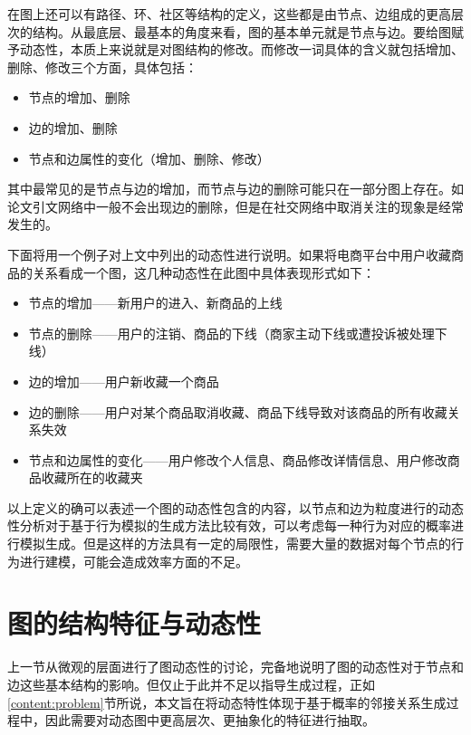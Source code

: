 \vspace{0.2cm}

在图上还可以有路径、环、社区等结构的定义，这些都是由节点、边组成的更高层次的结构。从最底层、最基本的角度来看，图的基本单元就是节点与边。要给图赋予动态性，本质上来说就是对图结构的修改。而修改一词具体的含义就包括增加、删除、修改三个方面，具体包括：

\begin{itemize}
    \item 节点的增加、删除
    \item 边的增加、删除
    \item 节点和边属性的变化（增加、删除、修改）
\end{itemize}

\vspace{0.2cm}

其中最常见的是节点与边的增加，而节点与边的删除可能只在一部分图上存在。如论文引文网络中一般不会出现边的删除，但是在社交网络中取消关注的现象是经常发生的。

下面将用一个例子对上文中列出的动态性进行说明。如果将电商平台中用户收藏商品的关系看成一个图，这几种动态性在此图中具体表现形式如下：

\begin{itemize}
    \item 节点的增加——新用户的进入、新商品的上线
    \item 节点的删除——用户的注销、商品的下线（商家主动下线或遭投诉被处理下线）
    \item 边的增加——用户新收藏一个商品
    \item 边的删除——用户对某个商品取消收藏、商品下线导致对该商品的所有收藏关系失效
    \item 节点和边属性的变化——用户修改个人信息、商品修改详情信息、用户修改商品收藏所在的收藏夹
\end{itemize}

\vspace{0.2cm}

以上定义的确可以表述一个图的动态性包含的内容，以节点和边为粒度进行的动态性分析对于基于行为模拟的生成方法比较有效，可以考虑每一种行为对应的概率进行模拟生成。但是这样的方法具有一定的局限性，需要大量的数据对每个节点的行为进行建模，可能会造成效率方面的不足。

\section{图的结构特征与动态性}
\label{cha:structure_dynamic}

上一节从微观的层面进行了图动态性的讨论，完备地说明了图的动态性对于节点和边这些基本结构的影响。但仅止于此并不足以指导生成过程，正如\ref{content:problem}节所说，本文旨在将动态特性体现于基于概率的邻接关系生成过程中，因此需要对动态图中更高层次、更抽象化的特征进行抽取。

